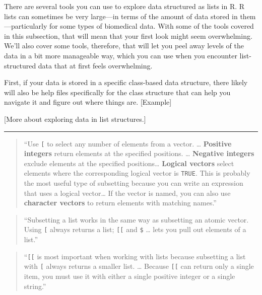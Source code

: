 \documentclass[]{tufte-book}
\begin{document}
There are several tools you can use to explore data structured as lists in R.
R lists can sometimes be very large---in terms of the amount of data stored in
them---particularly for some types of biomedical data. With some of the tools
covered in this subsection, that will mean that your first look might seem
overwhelming. We'll also cover some tools, therefore, that will let you peel
away levels of the data in a bit more manageable way, which you can use when
you encounter list-structured data that at first feels overwhelming.

First, if your data is stored in a specific class-based data structure, there
likely will also be help files specifically for the class structure that can
help you navigate it and figure out where things are. {[}Example{]}

{[}More about exploring data in list structures.{]}

\begin{center}\rule{0.5\linewidth}{0.5pt}\end{center}

\begin{quote}
``Use \texttt{{[}} to select any number of elements from a vector. \ldots{} \textbf{Positive
integers} return elements at the specified positions. \ldots{} \textbf{Negative
integers} exclude elements at the specified positions\ldots{}
\textbf{Logical vectors} select elements where the corresponding logical vector
is \texttt{TRUE}. This is probably the most useful type of subsetting
because you can write an expression that uses a logical vector\ldots{} If the
vector is named, you can also use \textbf{character vectors} to return elements
with matching names.'' \citep{wickham2019advanced}
\end{quote}

\begin{quote}
``Subsetting a list works in the same way as subsetting an atomic vector.
Using \texttt{{[}} always returns a list; \texttt{{[}{[}} and \texttt{\$} \ldots{} lets you pull out
elements of a list.'' \citep{wickham2019advanced}
\end{quote}

\begin{quote}
``\texttt{{[}{[}} is most important when working with lists because subsetting a list
with \texttt{{[}} always returns a smaller list. \ldots{} Because \texttt{{[}{[}} can return only
a single item, you must use it with either a single positive integer or
a single string.'' \citep{wickham2019advanced}
\end{quote}
\end{document}
